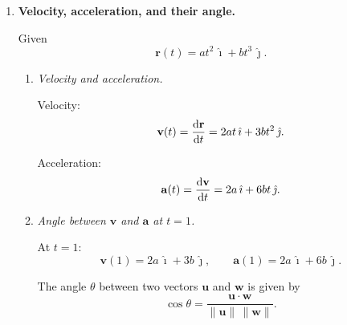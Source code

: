 \documentclass[../main.tex]{subfiles}
\begin{document}
\begin{enumerate}
\begin{enumerate}
    Units: $\mathbf{F}$ is volume flux per area per time, $\mathbf{A}$ is area, so the product is volume per time.

    \item \textit{Effect of orientation.}

    In general,
    \[
      Q = \mathbf{F} \cdot \mathbf{A}
      = |\mathbf{F}|\,|\mathbf{A}|\cos\theta,
    \]
    where $\theta$ is the angle between $\mathbf{F}$ and the surface normal.
    If you tilt the surface, its area vector $\mathbf{A}$ tilts. The effective flux is reduced by $\cos\theta$.
    \begin{itemize}
        \item If the surface is perpendicular to the flow (normal aligned with $\mathbf{F}$), $\theta=0$, $\cos\theta=1$, and $Q$ is maximal.
        \item If the surface is parallel to the flow (normal perpendicular to $\mathbf{F}$), $\theta=90^\circ$, $\cos\theta=0$, and $Q=0$.
    \end{itemize}
    Here the surface normal is $\hat{k}$, so only the $k$-component of $\mathbf{F}$ contributes to the flux.
\end{enumerate}


\item \textbf{Velocity, acceleration, and their angle.}

Given
\[
  \mathbf{r}(t) = a t^2 \,\hat{\imath} + b t^3 \,\hat{\jmath}.
\]

\begin{enumerate}
    \item \textit{Velocity and acceleration.}

    Velocity:
    \[
      \mathbf{v}(t) = \dv{\mathbf{r}}{t}
      = 2at \,\hat{\imath} + 3 b t^2 \,\hat{\jmath}.
    \]

    Acceleration:
    \[
      \mathbf{a}(t) = \dv{\mathbf{v}}{t}
      = 2a \,\hat{\imath} + 6 b t \,\hat{\jmath}.
    \]

    \item \textit{Angle between $\mathbf{v}$ and $\mathbf{a}$ at $t=1$.}

    At $t=1$:
    \[
      \mathbf{v}(1) = 2a\,\hat{\imath} + 3b\,\hat{\jmath}, \qquad
      \mathbf{a}(1) = 2a\,\hat{\imath} + 6b\,\hat{\jmath}.
    \]

    The angle $\theta$ between two vectors $\mathbf{u}$ and $\mathbf{w}$ is given by
    \[
      \cos\theta = \frac{\mathbf{u}\cdot\mathbf{w}}{\|\mathbf{u}\|\,\|\mathbf{w}\|}.
    \]


\end{enumerate}
\end{enumerate}
\end{document}
